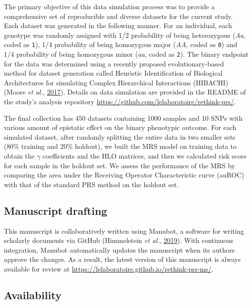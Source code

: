 \documentclass{ws-procs11x85}
\begin{document}
The primary objective of this data simulation process was to provide a
comprehensive set of reproducible and diverse datasets for the current
study. Each dataset was generated in the following manner. For an
individual, each genotype was randomly assigned with 1/2 probability of
being heterozygous (\emph{Aa}, coded as \texttt{1}), 1/4 probability of
being homozygous major (\emph{AA}, coded as \texttt{0}) and 1/4
probability of being homozygous minor (\emph{aa}, coded as \texttt{2}).
The binary endpoint for the data was determined using a recently
proposed evolutionary-based method for dataset generation called
Heuristic Identification of Biological Architectures for simulating
Complex Hierarchical Interactions (HIBACHI) (Moore \emph{et al.},
\protect\hyperlink{ref-pDXdtMFa}{2017}). Details on data simulation are
provided in the README of the study's analysis repository
\url{https://github.com/lelaboratoire/rethink-prs/}.

The final collection has 450 datasets containing 1000 samples and 10
SNPs with various amount of epistatic effect on the binary phenotypic
outcome. For each simulated dataset, after randomly splitting the entire
data in two smaller sets (80\% training and 20\% holdout), we built the
MRS model on training data to obtain the \(\gamma\) coefficients and the
HLO matrices, and then we calculated risk score for each sample in the
holdout set. We assess the performance of the MRS by comparing the area
under the Receiving Operator Characteristic curve (auROC) with that of
the standard PRS method on the holdout set.

\subsection{Manuscript drafting}\label{manuscript-drafting}


This manuscript is collaboratively written using Manubot, a software for
writing scholarly documents via GitHub (Himmelstein \emph{et al.},
\protect\hyperlink{ref-YuJbg3zO}{2019}). With continuous integration,
Manubot automatically updates the manuscript when its authors approve
the changes. As a result, the latest version of this manuscript is
always available for review at
\url{https://lelaboratoire.github.io/rethink-prs-ms/}.


\subsection{Availability}\label{availability}
\end{document}
